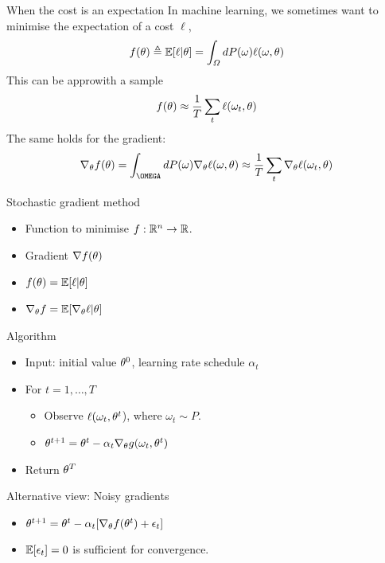 \documentclass[smaller]{beamer}
\begin{document}
\begin{frame}[label={sec:org5b8b4db}]{When the cost is an expectation}
In machine learning, we sometimes want to minimise the \alert{expectation} of a \alert{cost} \(\ell\), 
\[
f(\theta) \mathrel{\triangleq} \mathop{\mbox{\ensuremath{\mathbb{E}}}}\nolimits[\ell | \theta] = \int_\Omega dP(\omega) \ell(\omega, \theta)
\]
This can be appro\omegaimated with a sample
\[
f(\theta) \approx \frac{1}{T} \sum_t \ell(\omega_t, \theta)
\]
The same holds for the gradient:
\[
\nabla_\param f(\param) = \int_\OMEGA dP(\omega) \nabla_\param \ell(\omega, \param)
\approx \frac{1}{T} \sum_t \nabla_\param \ell(\omega_t, \param)
\]
\end{frame}




\begin{frame}[label={sec:org3aa7cfc}]{Stochastic gradient method}
\begin{itemize}
\item Function to \alert{minimise} \(f : \mathbb{R}^n \to \mathbb{R}\).
\item \alert{Gradient} \(\nabla f(\theta)\)
\item \(f(\theta) = \mathop{\mbox{\ensuremath{\mathbb{E}}}}\nolimits[\ell | \theta]\)
\item \(\nabla_\theta f = \mathop{\mbox{\ensuremath{\mathbb{E}}}}\nolimits[ \nabla_\theta \ell | \theta]\)
\end{itemize}

\pause
\begin{block}{Algorithm}
\begin{itemize}
\item Input: initial value \(\theta^0\), \alert{learning rate} schedule \(\alpha_t\)
\item For \(t=1, \ldots, T\)
\begin{itemize}
\item Observe \(\ell(\omega_t, \theta^t\)), where \(\omega_t \sim P\).
\item \(\theta^{t+1} = \theta^t - \alpha_t \nabla_\theta g(\omega_t, \theta^t)\)
\end{itemize}
\item Return \(\theta^T\)
\end{itemize}
\end{block}

\begin{block}{Alternative view: Noisy gradients}
\begin{itemize}
\item \(\theta^{t+1} = \theta^t - \alpha_t [\nabla_\theta f(\theta^t) + \epsilon_t]\)
\item \(\mathop{\mbox{\ensuremath{\mathbb{E}}}}\nolimits[\epsilon_t] = 0\) is sufficient for convergence.
\end{itemize}
\pause
\end{block}
\end{frame}
\end{document}
